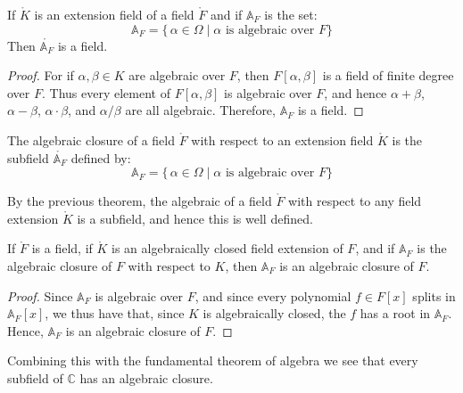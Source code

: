     \begin{theorem}
        If $\ring{K}$ is an extension field of a field $\ring{F}$ and if
        $\mathbb{A}_{F}$ is the set:
        \begin{equation}
            \mathbb{A}_{F}=\{\,\alpha\in\Omega\;|\;
                \alpha\textrm{ is algebraic over }F\}
        \end{equation}
        Then $\ring{\mathbb{A}_{F}}$ is a field.
    \end{theorem}
    \begin{proof}
        For if $\alpha,\beta\in{K}$ are algebraic over $F$, then
        $F[\alpha,\beta]$ is a field of finite degree over $F$. Thus every
        element of $F[\alpha,\beta]$ is algebraic over $F$, and hence
        $\alpha+\beta$, $\alpha-\beta$, $\alpha\cdot\beta$, and
        $\alpha/\beta$ are all algebraic. Therefore, $\mathbb{A}_{F}$ is a
        field.
    \end{proof}
    \begin{definition}
        The algebraic closure of a field $\ring{F}$ with respect to an
        extension field $\ring{K}$ is the subfield $\ring{\mathbb{A}_{F}}$
        defined by:
        \begin{equation}
            \mathbb{A}_{F}=\{\,\alpha\in\Omega\;|\;
            \alpha\textrm{ is algebraic over }F\}
        \end{equation}
    \end{definition}
    By the previous theorem, the algebraic of a field $\ring{F}$ with
    respect to any field extension $\ring{K}$ is a subfield, and hence this
    is well defined.
    \begin{theorem}
        If $\ring{F}$ is a field, if $\ring{K}$ is an algebraically closed
        field extension of $F$, and if $\mathbb{A}_{F}$ is the algebraic
        closure of $F$ with respect to $K$, then $\mathbb{A}_{F}$ is an
        algebraic closure of $F$.
    \end{theorem}
    \begin{proof}
        Since $\mathbb{A}_{F}$ is algebraic over $F$, and since every
        polynomial $f\in{F}[x]$ splits in $\mathbb{A}_{F}[x]$, we thus have
        that, since $K$ is algebraically closed, the $f$ has a root in
        $\mathbb{A}_{F}$. Hence, $\mathbb{A}_{F}$ is an algebraic closure
        of $F$.
    \end{proof}
    Combining this with the fundamental theorem of algebra we see that
    every subfield of $\mathbb{C}$ has an algebraic closure.
